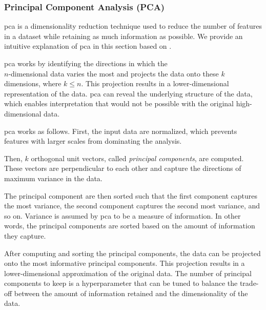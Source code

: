 \subsubsection{Principal Component Analysis (PCA)}\label{subsec:pca}
\gls{pca} is a dimensionality reduction technique used to reduce the number of features in a dataset while retaining as much information as possible.
We provide an intuitive explanation of \gls{pca} in this section based on \citet{dataminingConcepts}.

\gls{pca} works by identifying the directions in which the\\$n$-dimensional data varies the most and projects the data onto these $k$ dimensions, where $k \leq n$.
This projection results in a lower-dimensional representation of the data.
\gls{pca} can reveal the underlying structure of the data, which enables interpretation that would not be possible with the original high-dimensional data.

\gls{pca} works as follows.
First, the input data are normalized, which prevents features with larger scales from dominating the analysis.

Then, $k$ orthogonal unit vectors, called \textit{principal components}, are computed.
These vectors are perpendicular to each other and capture the directions of maximum variance in the data.

The principal component are then sorted such that the first component captures the most variance, the second component captures the second most variance, and so on.
Variance is assumed by \gls{pca} to be a measure of information.
In other words, the principal components are sorted based on the amount of information they capture.

After computing and sorting the principal components, the data can be projected onto the most informative principal components.
This projection results in a lower-dimensional approximation of the original data.
The number of principal components to keep is a hyperparameter that can be tuned to balance the trade-off between the amount of information retained and the dimensionality of the data.